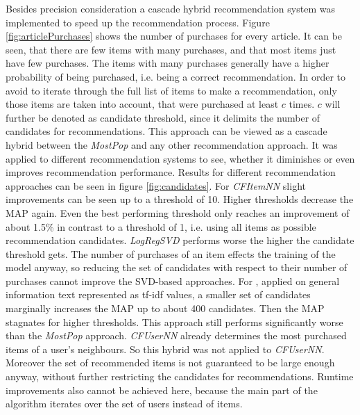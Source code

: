 \documentclass[10pt]{reportMaster}
\begin{document}
Besides precision consideration a cascade hybrid recommendation system was implemented to speed up the recommendation process.
Figure \ref{fig:articlePurchases} shows the number of purchases for every article.
It can be seen, that there are few items with many purchases, and that most items just have few purchases.
The items with many purchases generally have a higher probability of being purchased, i.e. being a correct recommendation.
In order to avoid to iterate through the full list of items to make a recommendation, only those items are taken into account, that were purchased at least $c$ times.
$c$ will further be denoted as candidate threshold, since it delimits the number of candidates for recommendations.
This approach can be viewed as a cascade hybrid between the \textit{MostPop} and any other recommendation approach.
It was applied to different recommendation systems to see, whether it diminishes or even improves recommendation performance.
Results for different recommendation approaches can be seen in figure \ref{fig:candidates}.
For \textit{CFItemNN} slight improvements can be seen up to a threshold of 10.
Higher thresholds decrease the MAP again.
Even the best performing threshold only reaches an improvement of about 1.5\% in contrast to a threshold of 1, i.e. using all items as possible recommendation candidates.
\textit{LogRegSVD} performs worse the higher the candidate threshold gets.
The number of purchases of an item effects the training of the model anyway, so reducing the set of candidates with respect to their number of purchases cannot improve the SVD-based approaches.
For , applied on general information text represented as tf-idf values, a smaller set of candidates marginally increases the MAP up to about 400 candidates.
Then the MAP stagnates for higher thresholds.
This approach still performs significantly worse than the \textit{MostPop} approach.
\textit{CFUserNN} already determines the most purchased items of a user's neighbours.
So this hybrid was not applied to \textit{CFUserNN}.
Moreover the set of recommended items is not guaranteed to be large enough anyway, without further restricting the candidates for recommendations.
Runtime improvements also cannot be achieved here, because the main part of the algorithm iterates over the set of users instead of items.
\end{document}
